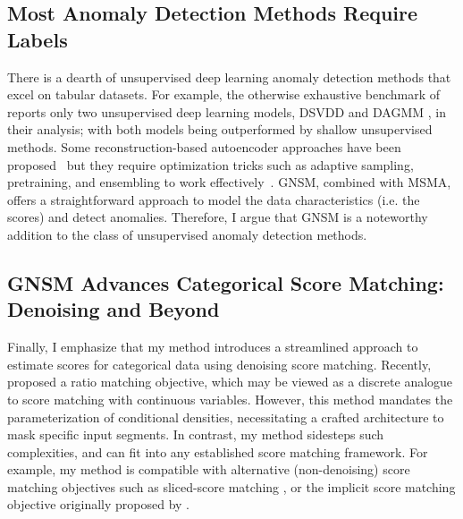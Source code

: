 
\subsection*{Most Anomaly Detection Methods Require Labels}

There is a dearth of unsupervised deep learning anomaly detection methods that excel on tabular datasets. For example, the otherwise exhaustive benchmark of~\cite{han2022adbench} reports only two unsupervised deep learning models, DSVDD \cite{pmlr-v80-ruff18a} and DAGMM \cite{zong2018deep}, in their analysis; with both models being outperformed by shallow unsupervised methods. Some reconstruction-based autoencoder approaches have been proposed~\cite{hawkins2002outlier} but they require optimization tricks such as adaptive sampling, pretraining, and ensembling to work effectively~\cite{chen2017outlier}. 
GNSM, combined with MSMA, offers a straightforward approach to model the data characteristics (i.e. the scores) and detect anomalies. Therefore, I argue that GNSM is a noteworthy addition to the class of unsupervised anomaly detection methods.

\subsection*{GNSM Advances Categorical Score Matching: Denoising and Beyond}

Finally, I emphasize that my method introduces a streamlined approach to estimate scores for categorical data using denoising score matching. Recently, \cite{sun2023scorebased} proposed a ratio matching objective, which may be viewed as a discrete analogue to score matching with continuous variables. However, this method mandates the parameterization of conditional densities, necessitating a crafted architecture to mask specific input segments. In contrast, my method sidesteps such complexities, and can fit into any established score matching framework. For example, my method is compatible with alternative (non-denoising) score matching objectives such as sliced-score matching \cite{song2020sliced}, or the implicit score matching objective originally proposed by \cite{hyvarinen2005}.

